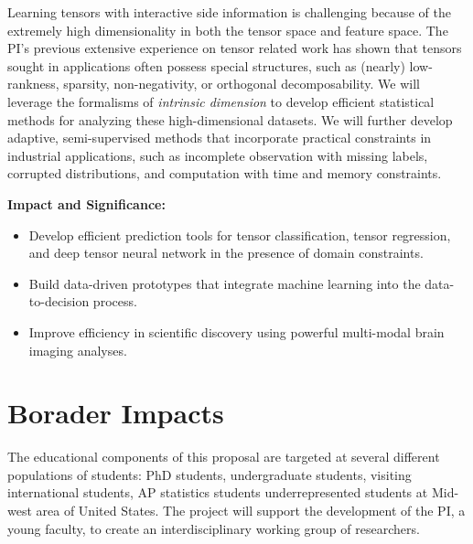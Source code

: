 \documentclass[10pt]{article}
\DeclareRobustCommand{\mybox}[2][gray!20]{%
\begin{tcolorbox}[   %
        breakable,
        left=0pt,
        right=0pt,
        top=0pt,
        bottom=0pt,
        colback=#1,
        colframe=#1,
        width=\dimexpr\textwidth\relax, 
        enlarge left by=0mm,
        boxsep=5pt,
        arc=0pt,outer arc=0pt,
        ]
        #2
\end{tcolorbox}
}
\DeclareRobustCommand{\mybox}[2][gray!20]{%
\begin{tcolorbox}[   %
        breakable,
        left=0pt,
        right=0pt,
        top=0pt,
        bottom=0pt,
        colback=#1,
        colframe=#1,
        width=\dimexpr\textwidth\relax, 
        enlarge left by=0mm,
        boxsep=5pt,
        arc=0pt,outer arc=0pt,
        ]
        #2
\end{tcolorbox}
}
\theoremstyle{definition}
\theoremstyle{definition}
\theoremstyle{definition}
\begin{document}
\begin{enumerate}
Learning tensors with interactive side information is challenging because of the extremely high dimensionality in both the tensor space and feature space. The PI's previous extensive experience on tensor related work has shown that tensors sought in applications often possess special structures, such as (nearly) low-rankness, sparsity, non-negativity, or orthogonal decomposability. We will leverage the formalisms of \emph{intrinsic dimension} to develop efficient statistical methods for analyzing these high-dimensional datasets. We will further develop adaptive, semi-supervised methods that incorporate practical constraints in industrial applications, such as incomplete observation with missing labels, corrupted distributions, and computation with time and memory constraints. 

\mybox[gray!20]{{\bf Impact and Significance:} 
\begin{itemize}[leftmargin=*]
\item Develop efficient prediction tools for tensor classification, tensor regression, and deep tensor neural network in the presence of domain constraints.
\item Build data-driven prototypes that integrate machine learning into the data-to-decision process. 
\item Improve efficiency in scientific discovery using powerful multi-modal brain imaging analyses. 
\end{itemize}
}


\section{Borader Impacts}
The educational components of this proposal are targeted at several different populations of students: PhD students, undergraduate students, visiting international students, AP statistics students underrepresented students at Mid-west area of United States. The project will support the development of the PI, a young faculty, to create an interdisciplinary working group of researchers.



\end{enumerate}
\end{document}
